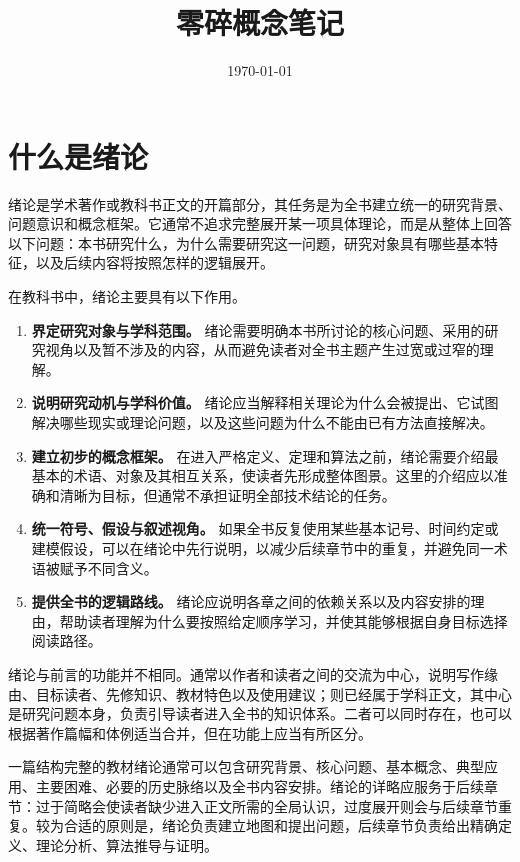 \documentclass[UTF8,12pt,a4paper,fontset=fandol]{ctexbook}
\title{零碎概念笔记}
\author{}
\date{\today}
\begin{document}
\maketitle
\tableofcontents
\clearpage


\chapter{什么是绪论}


绪论是学术著作或教科书正文的开篇部分，其任务是为全书建立统一的研究背景、问题意识和概念框架。它通常不追求完整展开某一项具体理论，而是从整体上回答以下问题：本书研究什么，为什么需要研究这一问题，研究对象具有哪些基本特征，以及后续内容将按照怎样的逻辑展开。


在教科书中，绪论主要具有以下作用。


\begin{enumerate}
  \item \textbf{界定研究对象与学科范围。}
  绪论需要明确本书所讨论的核心问题、采用的研究视角以及暂不涉及的内容，从而避免读者对全书主题产生过宽或过窄的理解。


  \item \textbf{说明研究动机与学科价值。}
  绪论应当解释相关理论为什么会被提出、它试图解决哪些现实或理论问题，以及这些问题为什么不能由已有方法直接解决。


  \item \textbf{建立初步的概念框架。}
  在进入严格定义、定理和算法之前，绪论需要介绍最基本的术语、对象及其相互关系，使读者先形成整体图景。这里的介绍应以准确和清晰为目标，但通常不承担证明全部技术结论的任务。


  \item \textbf{统一符号、假设与叙述视角。}
  如果全书反复使用某些基本记号、时间约定或建模假设，可以在绪论中先行说明，以减少后续章节中的重复，并避免同一术语被赋予不同含义。


  \item \textbf{提供全书的逻辑路线。}
  绪论应说明各章之间的依赖关系以及内容安排的理由，帮助读者理解为什么要按照给定顺序学习，并使其能够根据自身目标选择阅读路径。
\end{enumerate}


绪论与前言的功能并不相同。通常以作者和读者之间的交流为中心，说明写作缘由、目标读者、先修知识、教材特色以及使用建议；则已经属于学科正文，其中心是研究问题本身，负责引导读者进入全书的知识体系。二者可以同时存在，也可以根据著作篇幅和体例适当合并，但在功能上应当有所区分。


一篇结构完整的教材绪论通常可以包含研究背景、核心问题、基本概念、典型应用、主要困难、必要的历史脉络以及全书内容安排。绪论的详略应服务于后续章节：过于简略会使读者缺少进入正文所需的全局认识，过度展开则会与后续章节重复。较为合适的原则是，绪论负责建立地图和提出问题，后续章节负责给出精确定义、理论分析、算法推导与证明。
\end{document}
